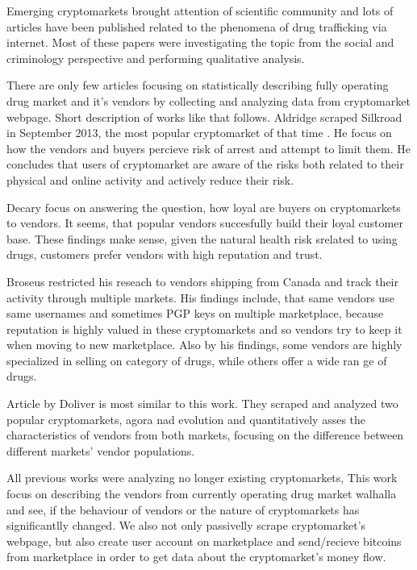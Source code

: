 \documentclass[
  digital, %
  table,   %
  lof,     %
  lot,     %
  oneside
]{fithesis3}
\begin{document}
Emerging cryptomarkets brought attention of scientific community
and lots of articles have been published related to the phenomena of drug trafficking via internet.
Most of these papers were investigating the topic from the social
and criminology perspective and performing qualitative analysis.
\parencite{aldridge2014not}
\parencite{barratt2014use}
\parencite{christin2013traveling}
\parencite{dolliver2015criminogenic}
\parencite{van2013silk}
\parencite{walsh2011drugs}
\parencite{martin2014lost}

There are only few articles focusing on statistically describing fully operating drug market and it's vendors
by collecting and analyzing data from cryptomarket webpage. Short description of works like that follows.
Aldridge \parencite{aldridge2017delivery} scraped Silkroad in September 2013, the most popular cryptomarket of that time
.
He focus on how the vendors and buyers percieve risk of arrest and attempt to limit them.
He concludes that users of cryptomarket are aware of the risks both related to their physical and online activity
and actively reduce their risk.

Decary \parencite{decary2017repeat} focus on answering the question, how loyal are buyers 
on cryptomarkets to vendors. It seems, that popular vendors succesfully build their loyal
customer base. These findings make sense, given the natural health risk srelated to using drugs,
customers prefer vendors with high reputation and trust.

Broseus \parencite{broseus2016studying} restricted his reseach to vendors shipping from Canada
and track their activity through multiple markets. His findings include, that same vendors
use same usernames and sometimes PGP keys on multiple marketplace, because reputation
is highly valued in these cryptomarkets and so vendors try to keep it when moving to new marketplace.
Also by his findings, some vendors are highly specialized in selling on category of drugs, while others offer a wide ran
ge of drugs.

Article by Doliver \parencite{dolliver2016characteristics} is most similar to this work.
They scraped and analyzed two popular cryptomarkets, agora nad evolution and quantitatively asses
the characteristics of vendors from both markets, focusing on the difference
 between different markets' vendor populations.

 All previous works were analyzing no longer existing cryptomarkets,
 This work focus on describing the vendors from currently operating drug market walhalla 
 and see, if the behaviour of vendors or the nature of cryptomarkets
 has significantlly changed. We also not only passivelly scrape cryptomarket's webpage,
 but also create user account on marketplace and send/recieve bitcoins from marketplace
 in order to get data about the cryptomarket's money flow.
 
\end{document}
